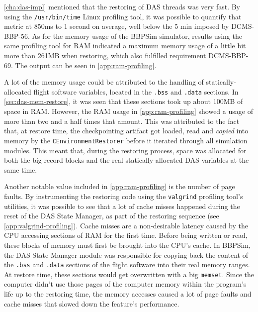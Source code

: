 {\autoref{cha:das-impl} mentioned that the restoring of DAS threads was very fast. By using the \texttt{/usr/bin/time} Linux profiling tool, it was possible to quantify that metric at  850ms to 1 second on average, well below the 5 min imposed by DCMS-BBP-56. As for the memory usage of the BBPSim simulator, results using the same profiling tool for RAM indicated a maximum memory usage of a little bit more than 261MB when restoring, which also fulfilled requirement DCMS-BBP-69. The output can be seen in \autoref{app:ram-profiling}. 

A lot of the memory usage could be attributed to the handling of statically-allocated flight software variables, located in the \texttt{.bss} and \texttt{.data} sections. In \autoref{sec:das-mem-restore}, it was seen that these sections took up about 100MB of space in RAM. However, the RAM usage in \autoref{app:ram-profiling} showed a usage of more than two and a half times that amount. This was attributed to the fact that, at restore time, the checkpointing artifact got loaded, read and \textit{copied} into memory by the \texttt{CEnvironmentRestorer} before it iterated through all simulation modules. This meant that, during the restoring process, space was allocated for both the big record blocks and the real statically-allocated DAS variables at the same time. 

Another notable value included in \autoref{app:ram-profiling} is the number of page faults. By instrumenting the restoring code using the \texttt{valgrind} profiling tool's utilities, it was possible to see that a lot of cache misses happened during the reset of the DAS State Manager, as part of the restoring sequence (see \autoref{app:valgrind-profiling}). Cache misses are a non-desirable latency caused by the CPU accessing sections of RAM for the first time. Before being written or read, these blocks of memory must first be brought into the CPU's cache\cite{misc:cache-misses}. In BBPSim, the DAS State Manager module was responsible for copying back the content of the \texttt{.bss} and \texttt{.data} sections of the flight software into their real memory ranges. At restore time, these sections would get overwritten with a big \texttt{memset}. Since the computer didn't use those pages of the computer memory within the program's life up to the restoring time, the memory accesses caused a lot of page faults and cache misses that slowed down the feature's performance.

}